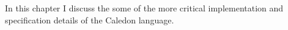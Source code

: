 In this chapter I discuss the some of the more critical
implementation and specification details of the Caledon language.